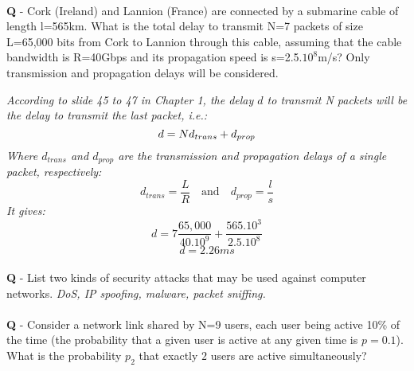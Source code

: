 \documentclass{llncs}
\newcounter{ques}
\renewcommand{\question}[1]{\paragraph{}\textbf{Q\theques} - #1\stepcounter{ques} }
\newcommand{\answer}[1]{\color{red}\textit{#1}\color{black}}
\begin{document}
\newpage

\question{Cork (Ireland) and Lannion (France) are
  connected by a submarine cable of length l=565km. What is the
  total delay to transmit N=7 packets of size L=65,000 bits from
  Cork to Lannion through this cable, assuming that the cable bandwidth is
  R=40Gbps and its propagation speed is s=2.5.$10^8$m/s? Only
  transmission and propagation delays will be considered.}

\answer{ According to slide 45 to 47 in Chapter 1, the delay $d$ to
  transmit N packets will be the delay to transmit the last packet, i.e.:
  \begin{equation*}
    d=Nd_{trans} + d_{prop} \\
  \end{equation*}
  Where $d_{trans}$ and $d_{prop}$ are the transmission and
  propagation delays of a single packet, respectively:
  \begin{equation*}
    d_{trans} = \frac{L}{R} \quad \mathrm{and} \quad d_{prop} = \frac{l}{s}
  \end{equation*}
  It gives:
  \begin{equation*}
    d = 7\frac{65,000}{40.10^9}+\frac{565.10^3}{2.5.10^8}
  \end{equation*}
  \begin{equation*}
    d = 2.26 ms
  \end{equation*}
}

\newpage



\question{List two kinds of security attacks that may be used against computer networks.}
\answer{DoS, IP spoofing, malware, packet sniffing.}

\newpage

\question{Consider a network link shared by N=9 users, each user
  being active 10\% of the time (the probability that a given user is
  active at any given time is $p=0.1$). What is the probability $p_2$ that exactly $2$
  users are active simultaneously?}
\end{document}

